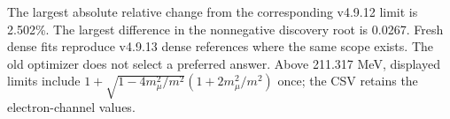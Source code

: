 The largest absolute relative change from the corresponding v4.9.12 limit is 2.502\%. The largest difference in the nonnegative discovery root is 0.0267. Fresh dense fits reproduce v4.9.13 dense references where the same scope exists. The old optimizer does not select a preferred answer. Above 211.317 MeV, displayed limits include $1+\sqrt{1-4m_\mu^2/m^2}(1+2m_\mu^2/m^2)$ once; the CSV retains the electron-channel values.
